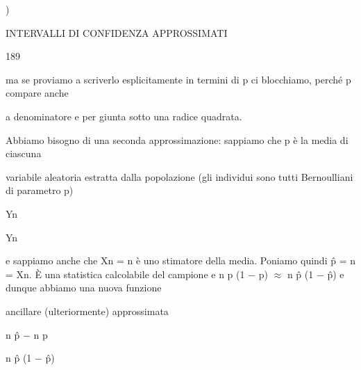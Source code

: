 \documentclass[a4paper,portrait,12pt]{article}
\begin{document}
)





\begin{flushleft}
 INTERVALLI DI CONFIDENZA APPROSSIMATI
\end{flushleft}





189





\begin{flushleft}
ma se proviamo a scriverlo esplicitamente in termini di p ci blocchiamo, perch\'{e} p compare anche
\end{flushleft}


\begin{flushleft}
a denominatore e per giunta sotto una radice quadrata.
\end{flushleft}


\begin{flushleft}
Abbiamo bisogno di una seconda approssimazione: sappiamo che p \`{e} la media di ciascuna
\end{flushleft}


\begin{flushleft}
variabile aleatoria estratta dalla popolazione (gli individui sono tutti Bernoulliani di parametro p)
\end{flushleft}


\begin{flushleft}
Yn
\end{flushleft}


\begin{flushleft}
Yn
\end{flushleft}


\begin{flushleft}
e sappiamo anche che Xn = n \`{e} uno stimatore della media. Poniamo quindi p̂ = n = Xn. \`{E} una statistica calcolabile del campione e n p (1 $-$ p) $\approx$ n p̂ (1 $-$ p̂) e dunque abbiamo una nuova funzione
\end{flushleft}


\begin{flushleft}
ancillare (ulteriormente) approssimata
\end{flushleft}


\begin{flushleft}
n p̂ $-$ n p
\end{flushleft}


\begin{flushleft}
n p̂ (1 $-$ p̂)
\end{flushleft}
\end{document}
